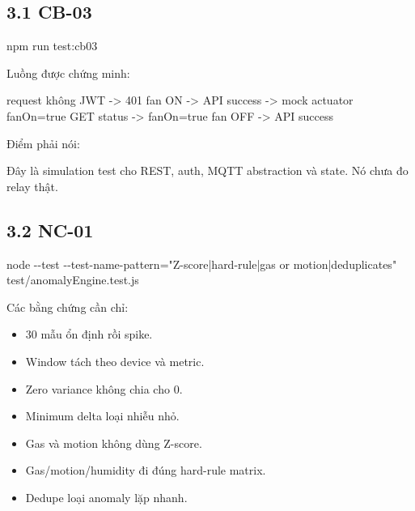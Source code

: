\documentclass[11pt,oneside,openany]{book}
\newenvironment{Shaded}{\begin{snugshade}}{\end{snugshade}}
\newcommand{\FunctionTok}[1]{\textcolor[rgb]{0.56,0.27,0.68}{#1}}
\newcommand{\NormalTok}[1]{\textcolor[rgb]{0.81,0.81,0.76}{#1}}
\newcommand{\OperatorTok}[1]{\textcolor[rgb]{0.81,0.81,0.76}{#1}}
\newcommand{\StringTok}[1]{\textcolor[rgb]{0.96,0.31,0.31}{#1}}
\renewenvironment{Shaded}{%
  \def\FrameCommand{\fboxsep=8pt\colorbox{shadecolor}}%
  \MakeFramed{\advance\hsize-\width\FrameRestore}%
}{\endMakeFramed}
\renewenvironment{quote}{%
  \def\FrameCommand{\hspace{1pt}{\color{Accent}\vrule width 3pt}\hspace{9pt}}%
  \MakeFramed{\advance\hsize-\width\FrameRestore}%
  \color{MutedText}\itshape
}{\endMakeFramed}
\providecommand{\tightlist}{\setlength{\itemsep}{1pt}\setlength{\parskip}{0pt}}
\begin{document}
\subsection{3.1 CB-03}\label{31-cb-03}

\begin{Shaded}
\begin{Highlighting}[]
\NormalTok{npm run test}\OperatorTok{:}\NormalTok{cb03}
\end{Highlighting}
\end{Shaded}

Luồng được chứng minh:

\begin{Shaded}
\begin{Highlighting}[]
\NormalTok{request không JWT {-}\textgreater{} 401}
\NormalTok{fan ON {-}\textgreater{} API success {-}\textgreater{} mock actuator fanOn=true}
\NormalTok{GET status {-}\textgreater{} fanOn=true}
\NormalTok{fan OFF {-}\textgreater{} API success}
\end{Highlighting}
\end{Shaded}

Điểm phải nói:

\begin{quote}
Đây là simulation test cho REST, auth, MQTT abstraction và state. Nó
chưa đo relay thật.
\end{quote}

\subsection{3.2 NC-01}\label{32-nc-01}

\begin{Shaded}
\begin{Highlighting}[]
\NormalTok{node }\OperatorTok{{-}{-}}\NormalTok{test }\OperatorTok{{-}{-}}\NormalTok{test{-}name{-}pattern}\OperatorTok{=}\StringTok{"Z{-}score|hard{-}rule|gas or motion|deduplicates"}\NormalTok{ test}\OperatorTok{/}\NormalTok{anomalyEngine}\OperatorTok{.}\FunctionTok{test}\OperatorTok{.}\FunctionTok{js}
\end{Highlighting}
\end{Shaded}

Các bằng chứng cần chỉ:

\begin{itemize}
\tightlist
\item
  30 mẫu ổn định rồi spike.
\item
  Window tách theo device và metric.
\item
  Zero variance không chia cho 0.
\item
  Minimum delta loại nhiễu nhỏ.
\item
  Gas và motion không dùng Z-score.
\item
  Gas/motion/humidity đi đúng hard-rule matrix.
\item
  Dedupe loại anomaly lặp nhanh.
\end{itemize}
\end{document}

